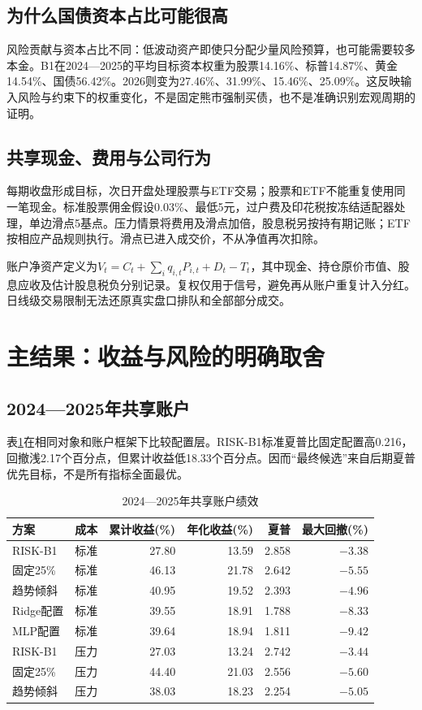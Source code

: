 \documentclass[11pt,a4paper]{article}
\newcommand{\note}[1]{\par\vspace{.1em}{\footnotesize\noindent 注：#1\par}}
\begin{document}
\subsection{为什么国债资本占比可能很高}
风险贡献与资本占比不同：低波动资产即使只分配少量风险预算，也可能需要较多本金。B1在2024—2025的平均目标资本权重为股票14.16\%、标普14.87\%、黄金14.54\%、国债56.42\%。2026则变为27.46\%、31.99\%、15.46\%、25.09\%。这反映输入风险与约束下的权重变化，不是固定熊市强制买债，也不是准确识别宏观周期的证明。

\subsection{共享现金、费用与公司行为}
每期收盘形成目标，次日开盘处理股票与ETF交易；股票和ETF不能重复使用同一笔现金。标准股票佣金假设0.03\%、最低5元，过户费及印花税按冻结适配器处理，单边滑点5基点。压力情景将费用及滑点加倍，股息税另按持有期记账；ETF按相应产品规则执行。滑点已进入成交价，不从净值再次扣除。

账户净资产定义为$V_t=C_t+\sum_iq_{i,t}P_{i,t}+D_t-T_t$，其中现金、持仓原价市值、股息应收及估计股息税负分别记录。复权仅用于信号，避免再从账户重复计入分红。日线级交易限制无法还原真实盘口排队和全部部分成交。

\clearpage
\section{主结果：收益与风险的明确取舍}
\subsection{2024—2025年共享账户}
表\ref{tab:main}在相同对象和账户框架下比较配置层。RISK-B1标准夏普比固定配置高0.216，回撤浅2.17个百分点，但累计收益低18.33个百分点。因而“最终候选”来自后期夏普优先目标，不是所有指标全面最优。

\begin{table}[htbp]\centering\small
\caption{2024—2025年共享账户绩效}\label{tab:main}
\begin{tabular}{@{}llrrrr@{}}\toprule
方案 & 成本 & 累计收益(\%) & 年化收益(\%) & 夏普 & 最大回撤(\%) \\\midrule
RISK-B1 & 标准 & 27.80 & 13.59 & 2.858 & $-3.38$ \\
固定25\% & 标准 & 46.13 & 21.78 & 2.642 & $-5.55$ \\
趋势倾斜 & 标准 & 40.95 & 19.52 & 2.393 & $-4.96$ \\
Ridge配置 & 标准 & 39.55 & 18.91 & 1.788 & $-8.33$ \\
MLP配置 & 标准 & 39.64 & 18.94 & 1.811 & $-9.42$ \\\midrule
RISK-B1 & 压力 & 27.03 & 13.24 & 2.742 & $-3.44$ \\
固定25\% & 压力 & 44.40 & 21.03 & 2.556 & $-5.60$ \\
趋势倾斜 & 压力 & 38.03 & 18.23 & 2.254 & $-5.05$ \\
\bottomrule\end{tabular}
\note{2024-01-02至2025-12-31，485日，各100万元现金起步，2025继承持仓。零现金基准夏普采用252日约定。Ridge/MLP预测20日原价开盘收益，训练2020—2022、开发验证2023；它们不是与风险预算只差一个算法的严格配对实验。}
\end{table}
\end{document}
